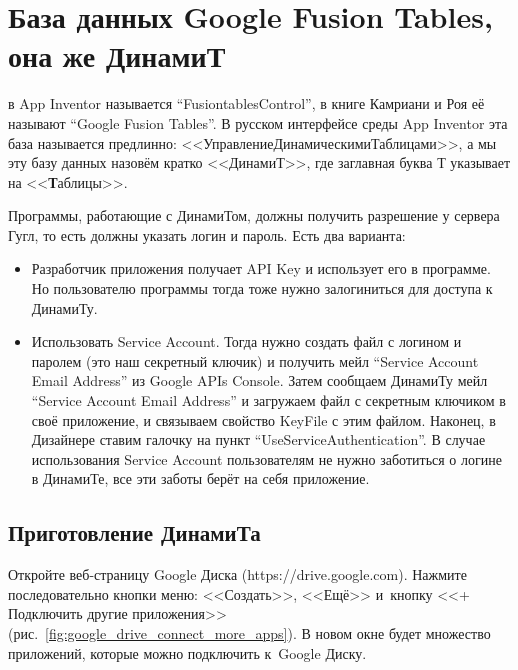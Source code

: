 \chapter{База данных Google Fusion Tables, она же ДинамиТ}
\label{ch:dynamite}


 в App Inventor называется ``FusiontablesControl'', 
в книге Камриани и Роя\cite{KamrianiAndRoy2016} её называют ``Google Fusion Tables''. 
В русском интерфейсе среды App Inventor эта база называется предлинно: 
<<УправлениеДинамическимиТаблицами>>, а мы эту базу данных назовём кратко <<ДинамиТ>>, 
где заглавная буква Т указывает на <<\textbf{Т}аблицы>>.

Программы, работающие с ДинамиТом, должны получить разрешение у сервера Гугл, то есть должны указать логин и пароль. Есть два варианта:
\begin{itemize}
    \item Разработчик приложения получает API Key и использует его в программе. 
        Но пользователю программы тогда тоже нужно залогиниться для доступа к ДинамиТу. 
    \item Использовать Service Account. Тогда нужно создать 
        файл с логином и паролем (это наш секретный ключик) и получить 
        мейл ``Service Account Email Address'' из Google APIs Console. 
        Затем сообщаем ДинамиТу мейл ``Service Account Email Address'' 
        и загружаем файл с секретным ключиком в своё приложение, 
        и связываем свойство KeyFile с этим файлом. 
        Наконец, в Дизайнере ставим галочку на пункт ``UseServiceAuthentication''. 
        В случае использования Service Account 
        пользователям не нужно заботиться о логине в ДинамиТе, 
        все эти заботы берёт на себя приложение.
\end{itemize}




\section{Приготовление ДинамиТа}


Откройте веб-страницу Google Диска (https://drive.google.com).
Нажмите последовательно 
кнопки меню: <<Создать>>, <<Ещё>> и~кнопку <<+ Подключить другие приложения>> 
(рис.~\ref{fig:google_drive_connect_more_apps}). В новом окне будет множество 
приложений, которые можно подключить к~Google Диску. 

